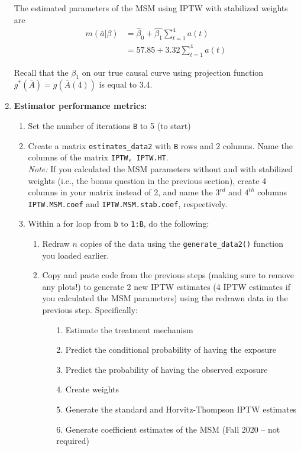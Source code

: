 \documentclass[answers]{exam}
\begin{document}
\begin{enumerate}
\begin{solution}
The estimated parameters of the MSM using IPTW with stabilized weights are 
\begin{align*}
m(\bar{a}|\beta) & = \hat{\beta}_0 + \hat{\beta_1}\sum_{t=1}^4a(t) \\
& = 57.85 + 3.32\sum_{t=1}^4a(t)
\end{align*}

Recall that the $\beta_1$ on our true causal curve using projection function $g^*(\bar{A}) = g(\bar{A}(4))$ is equal to 3.4.
\end{solution}

\item \textbf{Estimator performance metrics:}

\begin{enumerate}
\item Set the number of iterations \texttt{B} to 5 (to start)
\item Create a matrix \texttt{estimates\_data2} with \texttt{B} rows and 2 columns. Name the columns of the matrix \texttt{IPTW, IPTW.HT}. \\
\textit{Note:} If you calculated the MSM parameters without and with stabilized weights (i.e., the bonus question in the previous section), create 4 columns in your matrix instead of 2, and name the $3^{rd}$ and $4^{th}$ columns \texttt{IPTW.MSM.coef} and \texttt{IPTW.MSM.stab.coef}, respectively.
\item Within a for loop from \texttt{b} to \texttt{1:B}, do the following:
\begin{enumerate}
\item Redraw $n$ copies of the data using the \texttt{generate\_data2()} function you loaded earlier. 
\item Copy and paste code from the previous steps (making sure to remove any plots!) to generate 2 new IPTW estimates (4 IPTW estimates if you calculated the MSM parameters) using the redrawn data in the previous step. Specifically: 
\begin{enumerate}
\item[1.] Estimate the treatment mechanism
\item[2.] Predict the conditional probability of having the exposure
\item[3.] Predict the probability of having the observed exposure
\item[4.] Create weights
\item[5.] Generate the standard and Horvitz-Thompson IPTW estimates
\item[6.] Generate coefficient estimates of the MSM (Fall 2020 -- not required)

\end{enumerate}
\end{enumerate}
\end{enumerate}
\end{enumerate}
\end{document}
